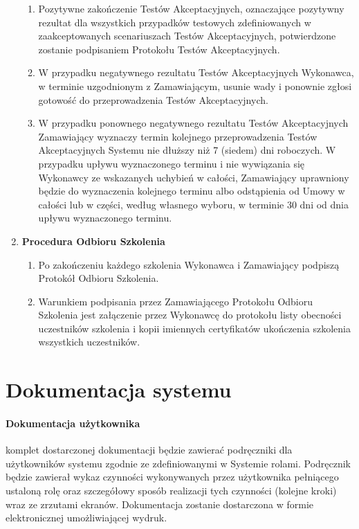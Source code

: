 \documentclass{article}
\begin{document}
\begin{enumerate}
\begin{enumerate}
\item Pozytywne zakończenie Testów Akceptacyjnych, oznaczające pozytywny rezultat dla wszystkich przypadków testowych zdefiniowanych w zaakceptowanych scenariuszach Testów Akceptacyjnych, potwierdzone zostanie podpisaniem Protokołu Testów Akceptacyjnych.
\item W przypadku negatywnego rezultatu Testów Akceptacyjnych Wykonawca, w terminie uzgodnionym z Zamawiającym, usunie wady i ponownie zgłosi gotowość do przeprowadzenia Testów Akceptacyjnych. 
\item W przypadku ponownego negatywnego rezultatu Testów Akceptacyjnych Zamawiający wyznaczy termin kolejnego przeprowadzenia Testów Akceptacyjnych Systemu nie dłuższy niż 7 (siedem) dni roboczych. W przypadku upływu wyznaczonego terminu i nie wywiązania się Wykonawcy ze wskazanych uchybień w całości, Zamawiający uprawniony będzie do wyznaczenia kolejnego terminu albo odstąpienia od Umowy w całości lub w części, według własnego wyboru, w terminie 30 dni od dnia upływu wyznaczonego terminu. 
\end{enumerate}
\item \textbf{Procedura Odbioru Szkolenia}
\begin{enumerate}
\item Po zakończeniu każdego szkolenia Wykonawca i Zamawiający podpiszą Protokół Odbioru Szkolenia.
\item Warunkiem podpisania przez Zamawiającego Protokołu Odbioru Szkolenia jest załączenie przez Wykonawcę do protokołu listy obecności uczestników szkolenia i kopii imiennych certyfikatów ukończenia szkolenia wszystkich uczestników.
\end{enumerate}
\end{enumerate}


\section{Dokumentacja systemu}
\paragraph{Dokumentacja użytkownika} komplet dostarczonej dokumentacji będzie zawierać podręczniki dla użytkowników systemu zgodnie ze zdefiniowanymi w Systemie rolami. Podręcznik będzie zawierał wykaz czynności wykonywanych przez użytkownika pełniącego ustaloną rolę oraz szczegółowy sposób realizacji tych czynności (kolejne kroki) wraz ze zrzutami ekranów. Dokumentacja zostanie dostarczona w formie elektronicznej umożliwiającej wydruk.
\end{document}
